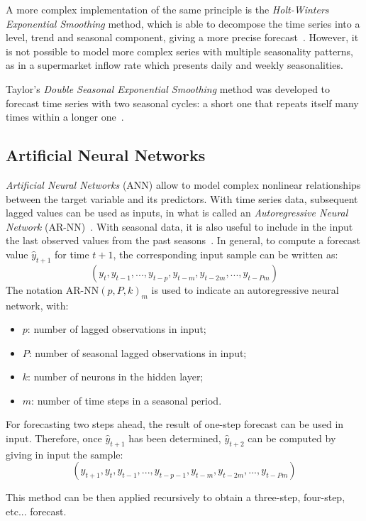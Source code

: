 A more complex implementation of the same principle is the \emph{Holt-Winters Exponential Smoothing} method, which is able to decompose the time series into a level, trend and seasonal component, giving a more precise forecast~\cite{holt}. However, it is not possible to model more complex series with multiple seasonality patterns, as in a supermarket inflow rate which presents daily and weekly seasonalities.

Taylor’s \emph{Double Seasonal Exponential Smoothing} method was developed to forecast time series with two seasonal cycles: a short one that repeats itself many times within a longer one~\cite{taylor}.

\subsection{Artificial Neural Networks}
\label{subsec:artificial_neural_networks}

\emph{Artificial Neural Networks} (ANN) allow to model complex nonlinear relationships between the target variable and its predictors. With time series data, subsequent lagged values can be used as inputs, in what is called an \emph{Autoregressive Neural Network} (AR-NN)~\cite{tang}. With seasonal data, it is also useful to include in the input the last observed values from the past seasons~\cite{hyndman2018}. In general, to compute a forecast value \( \hat{y}_{t+1} \) for time \( t+1 \), the corresponding input sample can be written as:
\[
  (y_{t}, y_{t-1}, ..., y_{t-p}, y_{t-m}, y_{t-2m}, ..., y_{t-Pm})
\]
The notation \( \text{AR-NN}(p, P, k)_m \) is used to indicate an autoregressive neural network, with:
\begin{itemize}
  \item \( p \): number of lagged observations in input;
  \item \( P \): number of seasonal lagged observations in input;
  \item \( k \): number of neurons in the hidden layer;
  \item \( m \): number of time steps in a seasonal period.
\end{itemize}

For forecasting two steps ahead, the result of one-step forecast can be used in input. Therefore, once \( \hat{y}_{t+1} \) has been determined, \( \hat{y}_{t+2} \) can be computed by giving in input the sample:
\[ (\hat{y}_{t+1}, y_{t}, y_{t-1}, ..., y_{t-p-1}, y_{t-m}, y_{t-2m}, ..., y_{t-Pm}) \]

This method can be then applied recursively to obtain a three-step, four-step, etc... forecast.

